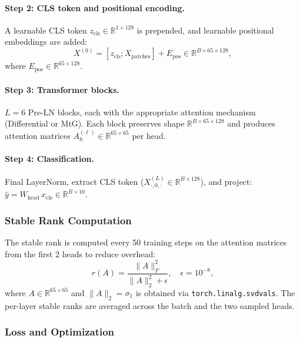 \documentclass[12pt, a4paper]{article}
\begin{document}
\paragraph{Step 2: CLS token and positional encoding.}
A learnable CLS token $z_{\text{cls}} \in \mathbb{R}^{1 \times 128}$
is prepended, and learnable positional embeddings are added:
\begin{equation}
    X^{(0)} = [z_{\text{cls}}; X_{\text{patches}}]
    + E_{\text{pos}} \in \mathbb{R}^{B \times 65 \times 128},
    \label{eq:cls_pos}
\end{equation}
where $E_{\text{pos}} \in \mathbb{R}^{65 \times 128}$.

\paragraph{Step 3: Transformer blocks.}
$L = 6$ Pre-LN blocks, each with the appropriate attention mechanism
(Differential or MtG). Each block preserves shape
$\mathbb{R}^{B \times 65 \times 128}$ and produces attention matrices
$A^{(\ell)}_h \in \mathbb{R}^{65 \times 65}$ per head.

\paragraph{Step 4: Classification.}
Final LayerNorm, extract CLS token ($X^{(L)}_{\cdot,0,\cdot}
\in \mathbb{R}^{B \times 128}$), and project:
$\hat{y} = W_{\text{head}}\, x_{\text{cls}} \in
\mathbb{R}^{B \times 10}$.

\subsubsection{Stable Rank Computation}

The stable rank is computed every 50 training steps on the attention
matrices from the first 2 heads to reduce overhead:
\begin{equation}
    r(A) = \frac{\|A\|_F^2}{\|A\|_2^2 + \epsilon},
    \quad \epsilon = 10^{-8},
    \label{eq:sr_impl}
\end{equation}
where $A \in \mathbb{R}^{65 \times 65}$ and $\|A\|_2 = \sigma_1$
is obtained via \texttt{torch.linalg.svdvals}. The per-layer stable
ranks are averaged across the batch and the two sampled heads.

\subsubsection{Loss and Optimization}
\end{document}
